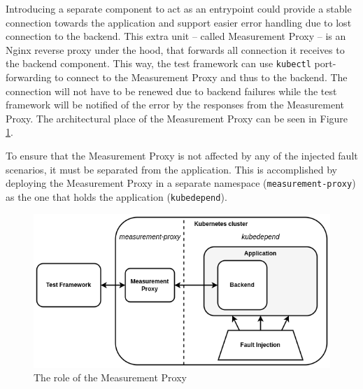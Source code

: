 Introducing a separate component to act as an entrypoint could provide a stable connection towards the application and support easier error handling due to lost connection to the backend. This extra unit -- called Measurement Proxy -- is an Nginx reverse proxy under the hood, that forwards all connection it receives to the backend component. This way, the test framework can use \texttt{kubectl} port-forwarding to connect to the Measurement Proxy and thus to the backend. The connection will not have to be renewed due to backend failures while the test framework will be notified of the error by the responses from the Measurement Proxy. The architectural place of the Measurement Proxy can be seen in Figure \ref{fig:measurement_proxy}.

To ensure that the Measurement Proxy is not affected by any of the injected fault scenarios, it must be separated from the application. This is accomplished by deploying the Measurement Proxy in a separate namespace (\texttt{measurement-proxy}) as the one that holds the application (\texttt{kubedepend}).


\begin{figure}[h]
	\centering
	\includegraphics[width=140mm, keepaspectratio]{figures/measurement_proxy.png}
	\caption{The role of the Measurement Proxy}
	\label{fig:measurement_proxy}
\end{figure}


